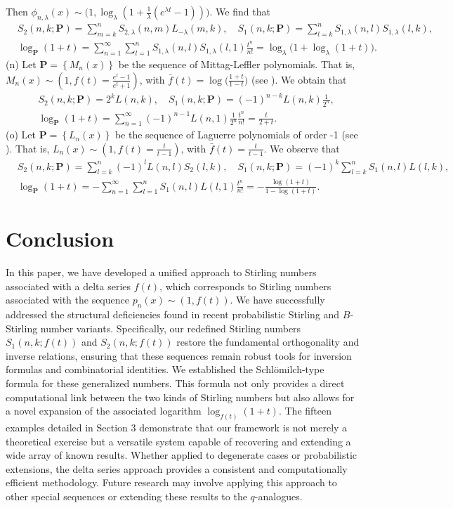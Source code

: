 \documentclass[a4paper,11pt]{amsart}
\begin{document}
Then $\phi_{n,\lambda}(x) \sim \big(1, \log_{\lambda}(1+\frac{1}{\lambda}(e^{\lambda t}-1))\big)$. We find that
\begin{align*}
&S_{2}(n,k;\mathbf{P})=\sum_{m=k}^{n}S_{2,\lambda}(n,m)L_{-\lambda}(m,k), \quad S_{1}(n,k;\mathbf{P})=\sum_{l=k}^{n}S_{1,\lambda}(n,l)S_{1,\lambda}(l,k), \\
&\log_{\mathbf{P}}(1+t)=\sum_{n=1}^{\infty} \sum_{l=1}^{n}S_{1,\lambda}(n,l)S_{1,\lambda}(l,1)\frac{t^{n}}{n!}=\log_{\lambda}\big(1+\log_{\lambda}(1+t)\big).
\end{align*}
(n) Let $\mathbf{P}=\left\{M_{n}(x)\right\}$ be the sequence of Mittag-Leffler polynomials. That is, $M_{n}(x) \sim (1,f(t)=\frac{e^{t}-1}{e^{t}+1})$, with $\bar{f}(t)=\log \big(\frac{1+t}{1-t}\big)$ (see \cite{25}). We obtain that
\begin{align*}
&S_{2}(n,k;\mathbf{P})=2^{k}L(n,k), \quad S_{1}(n,k;\mathbf{P})=(-1)^{n-k}L(n,k)\frac{1}{2^{n}}, \\
&\log_{\mathbf{P}}(1+t)=\sum_{n=1}^{\infty}(-1)^{n-1}L(n,1)\frac{1}{2^{n}}\frac{t^{n}}{n!}=\frac{t}{2+t}.
\end{align*}
(o) Let $\mathbf{P}=\left\{L_{n}(x)\right\}$ be the sequence of Laguerre polynomials of order -1 (see \cite{25}).
That is, $L_{n}(x) \sim (1, f(t)=\frac{t}{t-1})$, with $\bar{f}(t)=\frac{t}{t-1}$. 
We observe that
\begin{align*}
&S_{2}(n,k;\mathbf{P})=\sum_{l=k}^{n}(-1)^{l}L(n,l)S_{2}(l,k), \quad
S_{1}(n,k;\mathbf{P})=(-1)^{k}\sum_{l=k}^{n}S_{1}(n,l)L(l,k), \\
&\log_{\mathbf{P}}(1+t)=-\sum_{n=1}^{\infty}\sum_{l=1}^{n}S_{1}(n,l)L(l,1)\frac{t^{n}}{n!}=-\frac{\log(1+t)}{1-\log(1+t)}.
\end{align*}

\section{Conclusion}
In this paper, we have developed a unified approach to Stirling numbers associated with a delta series $f(t)$, which corresponds to Stirling numbers associated with the sequence $p_{n}(x) \sim (1,f(t))$.  We have successfully addressed the structural deficiencies found in recent probabilistic Stirling and $B$-Stirling number variants. Specifically, our redefined Stirling numbers $S_{1}(n,k; f(t))$ and $S_{2}(n,k; f(t))$ restore the fundamental orthogonality and inverse relations, ensuring that these sequences remain robust tools for inversion formulas and combinatorial identities. We established the Schl\"{o}milch-type formula for these generalized numbers. This formula not only provides a direct computational link between the two kinds of Stirling numbers but also allows for a novel expansion of the associated logarithm $\log_{f(t)}(1+t)$. The fifteen examples detailed in Section 3 demonstrate that our framework is not merely a theoretical exercise but a versatile system capable of recovering and extending a wide array of known results. Whether applied to degenerate cases or probabilistic extensions, the delta series approach provides a consistent and computationally efficient methodology. Future research may involve applying this approach to other special sequences or extending these results to the $q$-analogues.
\end{document}
